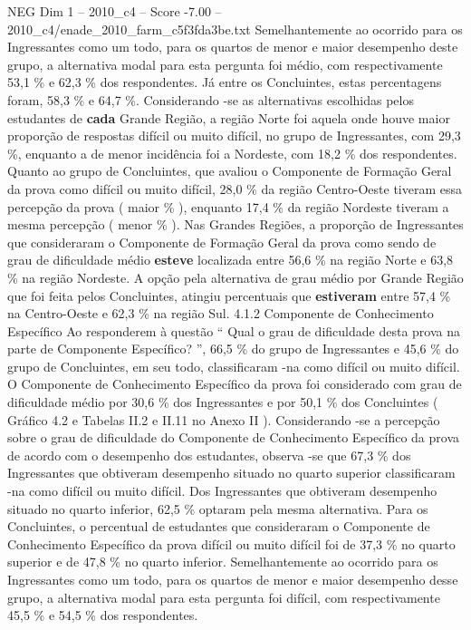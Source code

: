 \begin{textsample}{NEG Dim 1 – 2010\_c4 – Score -7.00 – 2010\_c4/enade\_2010\_farm\_c5f3fda3be.txt}
Semelhantemente ao ocorrido para os Ingressantes como um todo, para os quartos de menor e maior desempenho deste grupo, a alternativa modal para esta pergunta foi médio, com respectivamente 53,1 \% e 62,3 \% dos respondentes.
Já entre os Concluintes, estas percentagens foram, 58,3 \% e 64,7 \%.
Considerando -se as alternativas escolhidas pelos estudantes de \textbf{cada} Grande Região, a região Norte foi aquela onde houve maior proporção de respostas difícil ou muito difícil, no grupo de Ingressantes, com 29,3 \%, enquanto a de menor incidência foi a Nordeste, com 18,2 \% dos respondentes.
Quanto ao grupo de Concluintes, que avaliou o Componente de Formação Geral da prova como difícil ou muito difícil, 28,0 \% da região Centro-Oeste tiveram essa percepção da prova ( maior \% ), enquanto 17,4 \% da região Nordeste tiveram a mesma percepção ( menor \% ).
Nas Grandes Regiões, a proporção de Ingressantes que consideraram o Componente de Formação Geral da prova como sendo de grau de dificuldade médio \textbf{esteve} localizada entre 56,6 \% na região Norte e 63,8 \% na região Nordeste.
A opção pela alternativa de grau médio por Grande Região que foi feita pelos Concluintes, atingiu percentuais que \textbf{estiveram} entre 57,4 \% na Centro-Oeste e 62,3 \% na região Sul. 4.1.2 Componente de Conhecimento Específico Ao responderem à questão “ Qual o grau de dificuldade desta prova na parte de Componente Específico? ”, 66,5 \% do grupo de Ingressantes e 45,6 \% do grupo de Concluintes, em seu todo, classificaram -na como difícil ou muito difícil.
O Componente de Conhecimento Específico da prova foi considerado com grau de dificuldade médio por 30,6 \% dos Ingressantes e por 50,1 \% dos Concluintes ( Gráfico 4.2 e Tabelas II.2 e II.11 no Anexo II ).
Considerando -se a percepção sobre o grau de dificuldade do Componente de Conhecimento Específico da prova de acordo com o desempenho dos estudantes, observa -se que 67,3 \% dos Ingressantes que obtiveram desempenho situado no quarto superior classificaram -na como difícil ou muito difícil.
Dos Ingressantes que obtiveram desempenho situado no quarto inferior, 62,5 \% optaram pela mesma alternativa.
Para os Concluintes, o percentual de estudantes que consideraram o Componente de Conhecimento Específico da prova difícil ou muito difícil foi de 37,3 \% no quarto superior e de 47,8 \% no quarto inferior.
Semelhantemente ao ocorrido para os Ingressantes como um todo, para os quartos de menor e maior desempenho desse grupo, a alternativa modal para esta pergunta foi difícil, com respectivamente 45,5 \% e 54,5 \% dos respondentes.

\end{textsample}

